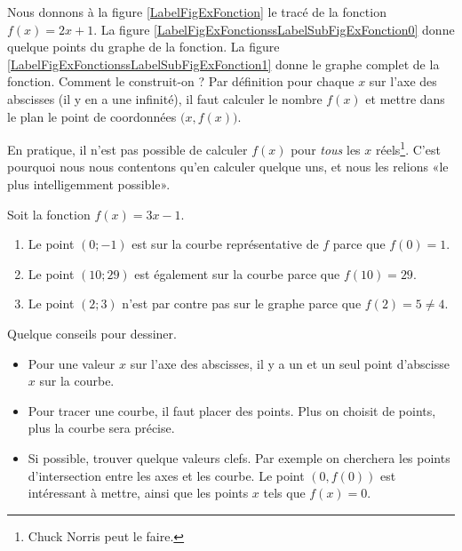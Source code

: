 \newcommand{\CaptionFigExFonction}{Comment tracer la fonction \( f(x)=2x+1\) ?}


Nous donnons à la figure \ref{LabelFigExFonction} le tracé de la fonction \( f(x)=2x+1\). La figure \ref{LabelFigExFonctionssLabelSubFigExFonction0} donne quelque points du graphe de la fonction. La figure \ref{LabelFigExFonctionssLabelSubFigExFonction1} donne le graphe complet de la fonction. Comment le construit-on ? Par définition pour chaque \( x\) sur l'axe des abscisses (il y en a une infinité), il faut calculer le nombre \( f(x)\) et mettre dans le plan le point de coordonnées \( \big( x,f(x) \big)\).

En pratique, il n'est pas possible de calculer \( f(x)\) pour \emph{tous} les \( x\) réels\footnote{Chuck Norris peut le faire.}. C'est pourquoi nous nous contentons qu'en calculer quelque uns, et nous les relions «le plus intelligemment possible».

\begin{example}
    Soit la fonction \( f(x)=3x-1\).
    \begin{enumerate}
        \item
            Le point \( (0;-1)\) est sur la courbe représentative de \( f\) parce que \( f(0)=1\).
        \item
            Le point \( (10;29)\) est également sur la courbe parce que \( f(10)=29\).
        \item
            Le point \( (2;3)\) n'est par contre pas sur le graphe parce que \( f(2)=5\neq 4\).
    \end{enumerate}
\end{example}

Quelque conseils pour dessiner.
\begin{itemize}
    \item
        Pour une valeur $x$ sur l'axe des abscisses, il y a un et un seul point d'abscisse $x$ sur la courbe.
    \item
        Pour tracer une courbe, il faut placer des points. Plus on choisit de points, plus la courbe sera précise.
    \item
        Si possible, trouver quelque valeurs clefs. Par exemple on cherchera les points d'intersection entre les axes et les courbe. Le point \( (0,f(0)) \) est intéressant à mettre, ainsi que les points \( x\) tels que \( f(x)=0\).
\end{itemize}

